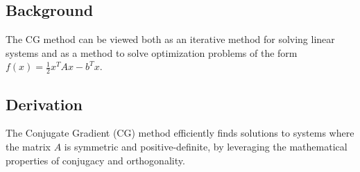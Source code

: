 \documentclass[11pt]{article}
\begin{document}
\subsection{Background}
The CG method can be viewed both as an iterative method for solving linear systems and as a method to solve optimization problems of the form \( f(x) = \frac{1}{2} x^T A x - b^T x \).

\subsection{Derivation}

The Conjugate Gradient (CG) method efficiently finds solutions to systems where the matrix \( A \) is symmetric and positive-definite, by leveraging the mathematical properties of conjugacy and orthogonality.
\end{document}
